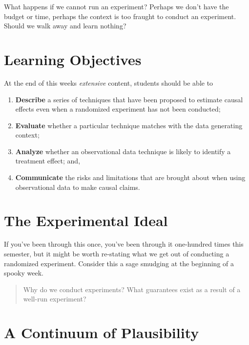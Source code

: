 \documentclass[
]{book}
\providecommand{\tightlist}{%
  \setlength{\itemsep}{0pt}\setlength{\parskip}{0pt}}
\begin{document}
What happens if we cannot run an experiment? Perhaps we don't have the
budget or time, perhaps the context is too fraught to conduct an
experiment. Should we walk away and learn nothing?

\hypertarget{learning-objectives-9}{%
\section{Learning Objectives}\label{learning-objectives-9}}

At the end of this weeks \emph{extensive} content, students should be
able to

\begin{enumerate}
\def\labelenumi{\arabic{enumi}.}
\tightlist
\item
  \textbf{Describe} a series of techniques that have been proposed to
  estimate causal effects even when a randomized experiment has not been
  conducted;
\item
  \textbf{Evaluate} whether a particular technique matches with the data
  generating context;
\item
  \textbf{Analyze} whether an observational data technique is likely to
  identify a treatment effect; and,
\item
  \textbf{Communicate} the risks and limitations that are brought about
  when using observational data to make causal claims.
\end{enumerate}

\hypertarget{the-experimental-ideal}{%
\section{The Experimental Ideal}\label{the-experimental-ideal}}

If you've been through this once, you've been through it one-hundred
times this semester, but it might be worth re-stating what we get out of
conducting a randomized experiment. Consider this a sage smudging at the
beginning of a spooky week.

\begin{quote}
Why do we conduct experiments? What guarantees exist as a result of a
well-run experiment?
\end{quote}

\hypertarget{a-continuum-of-plausibility}{%
\section{A Continuum of
Plausibility}\label{a-continuum-of-plausibility}}
\end{document}
